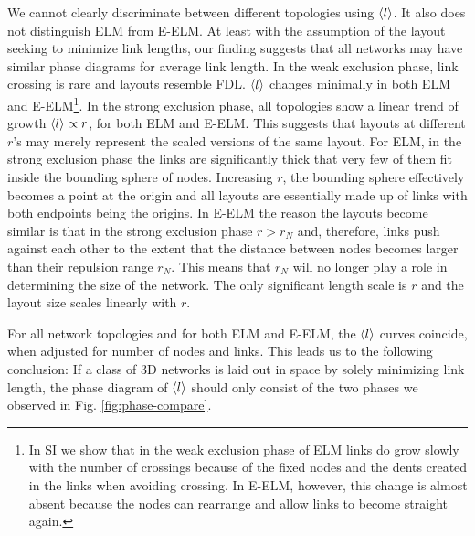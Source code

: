 \documentclass[nofootinbib,preprint,floatfix,endfloats]{revtex4} %
\begin{document}
We cannot clearly discriminate between different topologies using $\left<l\right>$. 
It also does not distinguish ELM from E-ELM. 
At least with the assumption of the layout seeking to minimize link lengths, our finding suggests that all networks may have similar phase diagrams for average link length. 
In the weak exclusion phase, link crossing is rare and layouts resemble FDL.
$\left<l\right>$ changes minimally in both ELM and E-ELM\footnote{
In SI we show that in the weak exclusion phase of ELM links do grow slowly with the number of crossings because of the fixed nodes and the dents created in the links when avoiding crossing. 
In E-ELM, however, this change is almost absent because the nodes can rearrange and allow links to become straight again.}. 
In the strong exclusion phase, all topologies show a linear trend of growth $\left<l\right> \propto r$, for both ELM and E-ELM.
This suggests that layouts at different $r$'s may merely represent the scaled versions of the same layout.
For ELM, %
in the strong exclusion phase the links are significantly thick that very few of them fit inside the bounding sphere of nodes. 
Increasing $r$, the bounding sphere effectively becomes a point at the origin and all layouts are essentially made up of links with both endpoints being the origins. 
In E-ELM the reason the layouts become similar is that in the strong exclusion phase $r > r_N$ and, therefore, links push against each other to the extent that the distance between nodes becomes larger than their repulsion range $r_N$. This means that $r_N$ will no longer play a role in determining the size of the network. The only significant length scale is $r$ and the layout size scales linearly with $r$. 

For all network topologies and for both ELM and E-ELM, the $\left<l\right>$ curves coincide, 
when adjusted for number of nodes and links. This leads us to the following conclusion: 
If a class of 3D networks is laid out in space by solely minimizing link length, the phase diagram of $\left<l\right>$ should only consist of the two phases we observed in Fig. \ref{fig:phase-compare}. 
\end{document}
